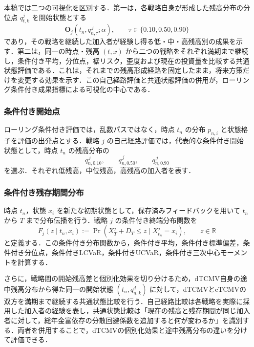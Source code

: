 \documentclass[10pt,a4paper]{article}
\theoremstyle{plain}
\theoremstyle{definition}
\newcommand{\R}{\mathbb{R}}
\begin{document}
本稿では二つの可視化を区別する．第一は，各戦略自身が形成した残高分布の分位点 $q_{t,k}^{j}$ を開始状態とする
\begin{equation}
  \mathbf O_j\!\left(t_n,q_{n,\tau}^{\,j};\alpha\right),
  \qquad \tau\in\{0.10,0.50,0.90\}
  \label{eq:self-path-rolling-profile}
\end{equation}
であり，その戦略を継続した加入者が経験し得る低・中・高残高別の成果を示す．第二は，同一の時点・残高 $(t,x)$ から二つの戦略をそれぞれ満期まで継続し，条件付き平均，分位点，裾リスク，歪度および現在の投資量を比較する共通状態評価である．これは，それまでの残高形成経路を固定したまま，将来方策だけを変更する効果を示す．この自己経路評価と共通状態評価の併用が，ローリング条件付き成果指標による可視化の中心である．

\subsubsection{条件付き開始点}

ローリング条件付き評価では，乱数パスではなく，時点 $t_n$ の分布 $p_{n,i}$ と状態格子を評価の出発点とする．戦略 $j$ の自己経路評価では，代表的な条件付き開始状態として，時点 $t_n$ の残高分布の
\begin{equation}
  q_{n,0.10}^{\,j},\qquad q_{n,0.50}^{\,j},\qquad q_{n,0.90}^{\,j}
  \label{eq:rolling-quantiles}
\end{equation}
を選ぶ．それぞれ低残高，中位残高，高残高の加入者を表す．

\subsubsection{条件付き残存期間分布}

時点 $t_n$，状態 $x_i$ を新たな初期状態として，保存済みフィードバックを用いて $t_n$ から $T$ まで分布伝播を行う．戦略 $j$ の条件付き終端分布関数を
\begin{equation}
  F_j(z\mid t_n,x_i)
  :=\Pr\!\left(X_T^j+D_T\leq z\mid X_{t_n}^j=x_i\right),
  \qquad z\in\R
  \label{eq:conditional-terminal-law}
\end{equation}
と定義する．この条件付き分布関数から，条件付き平均，条件付き標準偏差，条件付き分位点，条件付きLCVaR，条件付きUCVaR，条件付き三次中心モーメントを計算する．

さらに，戦略間の開始残高差と個別化効果を切り分けるため，dTCMV自身の途中残高分布から得た同一の開始状態 $(t_n,q_{n,k}^{d})$ に対して，dTCMVとcTCMVの双方を満期まで継続する共通状態比較を行う．自己経路比較は各戦略を実際に採用した加入者の経験を表し，共通状態比較は「現在の残高と残存期間が同じ加入者に対して，総年金富依存の分散回避係数を追加すると何が変わるか」を識別する．両者を併用することで，dTCMVの個別化効果と途中残高分布の違いを分けて評価できる．
\end{document}
